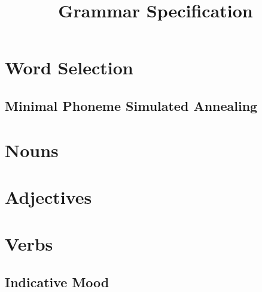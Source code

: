 \documentclass{book}
\title{Grammar Specification}
\author{}
\date{}
\begin{document}
\maketitle
\tableofcontents

\chapter{Word Selection}
\section{Minimal Phoneme Simulated Annealing}

\chapter{Nouns}

\chapter{Adjectives}

\chapter{Verbs}

\section{Indicative Mood}
\end{document}
